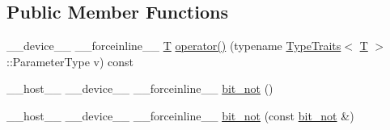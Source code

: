 \subsection*{Public Member Functions}
\begin{DoxyCompactItemize}
\item 
\-\_\-\-\_\-device\-\_\-\-\_\- \-\_\-\-\_\-forceinline\-\_\-\-\_\- \hyperlink{calib3d_8hpp_a3efb9551a871ddd0463079a808916717}{T} \hyperlink{structcv_1_1gpu_1_1device_1_1bit__not_a5bd20e033c8c848e635f32ad34757fb5}{operator()} (typename \hyperlink{structcv_1_1gpu_1_1device_1_1TypeTraits}{Type\-Traits}$<$ \hyperlink{calib3d_8hpp_a3efb9551a871ddd0463079a808916717}{T} $>$\-::Parameter\-Type v) const 
\item 
\-\_\-\-\_\-host\-\_\-\-\_\- \-\_\-\-\_\-device\-\_\-\-\_\- \-\_\-\-\_\-forceinline\-\_\-\-\_\- \hyperlink{structcv_1_1gpu_1_1device_1_1bit__not_ad4e4f42ea231d4804185184e188017e9}{bit\-\_\-not} ()
\item 
\-\_\-\-\_\-host\-\_\-\-\_\- \-\_\-\-\_\-device\-\_\-\-\_\- \-\_\-\-\_\-forceinline\-\_\-\-\_\- \hyperlink{structcv_1_1gpu_1_1device_1_1bit__not_a572fa8fbd0687155b77cf08f2589834d}{bit\-\_\-not} (const \hyperlink{structcv_1_1gpu_1_1device_1_1bit__not}{bit\-\_\-not} \&)
\end{DoxyCompactItemize}


